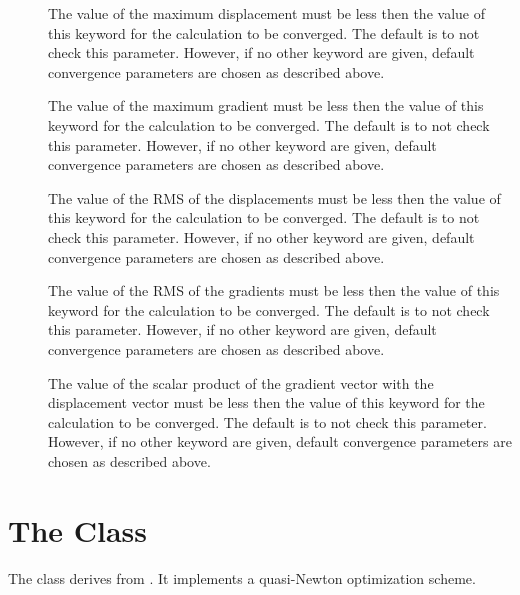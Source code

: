 \begin{description}
  \item[] The value of the maximum displacement must be
     less then the value of this keyword for the calculation to be
     converged.  The default is to not check this parameter.  However, if
     no other keyword are given, default convergence parameters are chosen
     as described above.

  \item[] The value of the maximum gradient must be less
     then the value of this keyword for the calculation to be converged.
     The default is to not check this parameter.  However, if no other
     keyword are given, default convergence parameters are chosen as
     described above.

  \item[] The value of the RMS of the displacements must
     be less then the value of this keyword for the calculation to be
     converged.  The default is to not check this parameter.  However, if
     no other keyword are given, default convergence parameters are chosen
     as described above.

  \item[] The value of the RMS of the gradients must be
     less then the value of this keyword for the calculation to be
     converged.  The default is to not check this parameter.  However, if
     no other keyword are given, default convergence parameters are chosen
     as described above.

  \item[] The value of the scalar product of the gradient
     vector with the displacement vector must be less then the value of
     this keyword for the calculation to be converged.  The default is to
     not check this parameter.  However, if no other keyword are given,
     default convergence parameters are chosen as described above.

\end{description}


\section{The  Class}\label{QNewtonOpt}

The  class derives from .  It
implements a quasi-Newton optimization scheme.

